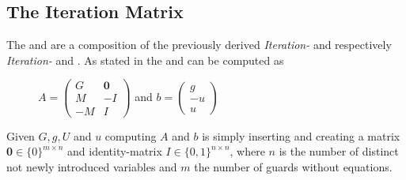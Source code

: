 \subsection{The Iteration Matrix}
The \iterationmatrix and \iterationconstants are a composition of the previously derived \textit{Iteration-} and \guardmatrix respectively \textit{Iteration- } and \guardconstants. \newline
As stated in  the \iterationmatrix and \iterationconstants can be computed as
\begin{figure}[H]
	\centering
	$A = \begin{pmatrix} G & \textbf{0} \\ M & -I \\ -M & I \end{pmatrix}$ and $b = \begin{pmatrix} g \\ -u \\ u \end{pmatrix}$ \cite{leike2014geometric}
\end{figure}
Given $G, g, U$ and $u$ computing $A$ and $b$ is simply inserting and creating a matrix \textbf{0}$ \in \{0\}^{m\times n}$ and identity-matrix $I \in \{0,1\}^{n\times n}$, where $n$ is the number of distinct not newly introduced variables and $m$ the number of guards without equations.

